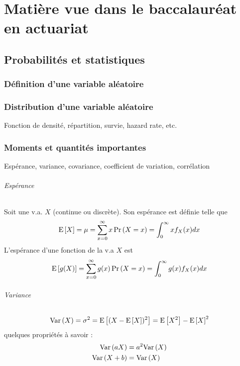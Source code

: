\documentclass[12pt, french]{report}
\begin{document}
\part{Matière vue dans le baccalauréat en actuariat}

\chapter{Probabilités et statistiques}

\section{Définition d'une variable aléatoire}

\section{Distribution d'une variable aléatoire}
Fonction de densité, répartition, survie, hazard rate, etc.

\section{Moments et quantités importantes}
Espérance, variance, covariance, coefficient de variation, corrélation

\paragraph{Espérance} Soit une v.a. $X$ (continue ou discrète). Son espérance est définie telle que
\begin{equation}
\label{eq:esp-univarie}
\mathrm{E} \left[ X \right] = \mu = \sum_{x=0}^{\infty} x \Pr \left( X = x \right) = \int_{0}^{\infty} x f_X(x) dx
\end{equation}
L'espérance d'une fonction de la v.a $X$ est
\begin{equation}
\label{eq:esp-fct-univarie}
\mathrm{E} \left[ g(X) \right] = \sum_{x=0}^{\infty} g(x) \Pr \left( X = x \right) = \int_{0}^{\infty} g(x) f_X(x) dx
\end{equation}

\paragraph{Variance}
\begin{equation}
\label{eq:variance}
\mathrm{Var} \left( X \right) = \sigma^2 = \mathrm{E} \left[ (X - \mathrm{E} \left[ X \right])^2 \right] = \mathrm{E} \left[ X^2 \right] - \mathrm{E} \left[ X \right]^2
\end{equation}
quelques propriétés à savoir : 
\begin{align*}
\mathrm{Var} \left( aX \right) 		& = a^2 \mathrm{Var} \left( X \right) \\
\mathrm{Var} \left( X + b \right)	& = \mathrm{Var} \left( X \right)
\end{align*}
\end{document}
